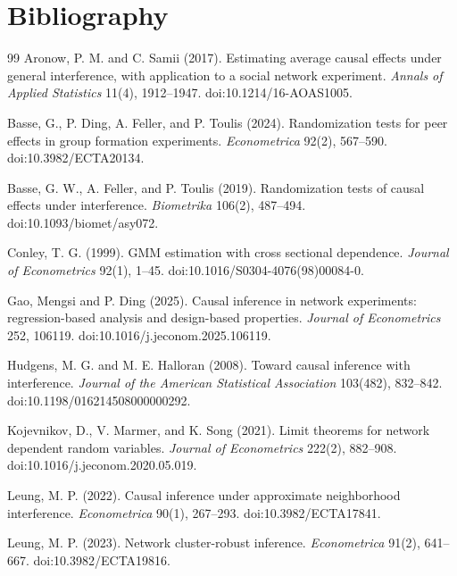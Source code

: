 \documentclass[11pt]{article}
\theoremstyle{definition}
\theoremstyle{plain}
\theoremstyle{remark}
\begin{document}
\section*{Bibliography}
\begin{thebibliography}{99}
Aronow, P. M. and C. Samii (2017).
Estimating average causal effects under general interference, with application
to a social network experiment.
\emph{Annals of Applied Statistics} 11(4), 1912--1947.
doi:10.1214/16-AOAS1005.

Basse, G., P. Ding, A. Feller, and P. Toulis (2024).
Randomization tests for peer effects in group formation experiments.
\emph{Econometrica} 92(2), 567--590.
doi:10.3982/ECTA20134.

Basse, G. W., A. Feller, and P. Toulis (2019).
Randomization tests of causal effects under interference.
\emph{Biometrika} 106(2), 487--494.
doi:10.1093/biomet/asy072.

Conley, T. G. (1999).
GMM estimation with cross sectional dependence.
\emph{Journal of Econometrics} 92(1), 1--45.
doi:10.1016/S0304-4076(98)00084-0.

Gao, Mengsi and P. Ding (2025).
Causal inference in network experiments: regression-based analysis and
design-based properties.
\emph{Journal of Econometrics} 252, 106119.
doi:10.1016/j.jeconom.2025.106119.

Hudgens, M. G. and M. E. Halloran (2008).
Toward causal inference with interference.
\emph{Journal of the American Statistical Association} 103(482), 832--842.
doi:10.1198/016214508000000292.

Kojevnikov, D., V. Marmer, and K. Song (2021).
Limit theorems for network dependent random variables.
\emph{Journal of Econometrics} 222(2), 882--908.
doi:10.1016/j.jeconom.2020.05.019.

Leung, M. P. (2022).
Causal inference under approximate neighborhood interference.
\emph{Econometrica} 90(1), 267--293.
doi:10.3982/ECTA17841.

Leung, M. P. (2023).
Network cluster-robust inference.
\emph{Econometrica} 91(2), 641--667.
doi:10.3982/ECTA19816.


\end{thebibliography}
\end{document}
